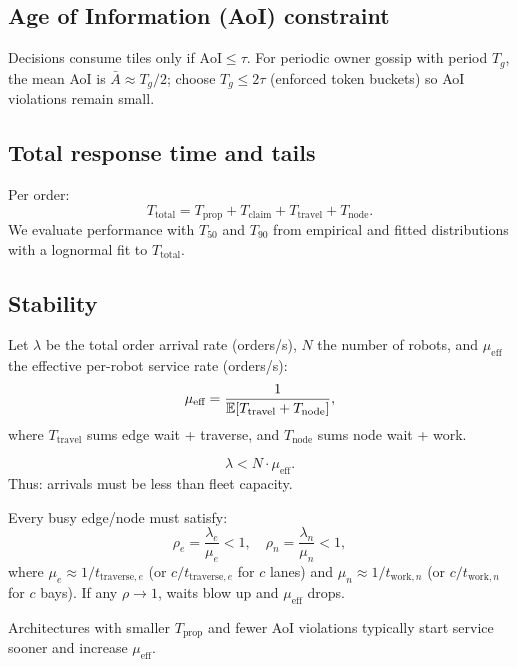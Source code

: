 \subsection*{Age of Information (AoI) constraint}
Decisions consume tiles only if $\text{AoI}\le \tau$.
For periodic owner gossip with period $T_g$, the mean AoI is $\bar{A}\!\approx\!T_g/2$; choose $T_g\!\le\!2\tau$ (enforced token buckets) so AoI violations remain small.

\subsection*{Total response time and tails}
Per order:
\begin{equation}
  T_{\text{total}} = T_{\text{prop}} + T_{\text{claim}} + T_{\text{travel}} + T_{\text{node}}.
\end{equation}
We evaluate performance with $T_{50}$ and $T_{90}$ from empirical and fitted distributions with a lognormal fit to $T_{\text{total}}$.

\subsection*{Stability}

Let $\lambda$ be the total order arrival rate (orders/s), $N$ the number of robots, and $\mu_{\text{eff}}$ the effective per-robot service rate (orders/s):
\begin{equation}
  \mu_{\text{eff}} = \frac{1}{\mathbb{E}[T_{\text{travel}} + T_{\text{node}}]},
\end{equation}
where $T_{\text{travel}}$ sums edge wait + traverse, and $T_{\text{node}}$ sums node wait + work.

\begin{equation}
  \lambda < N \cdot \mu_{\text{eff}}.
\end{equation}
Thus: arrivals must be less than fleet capacity.

Every busy edge/node must satisfy:
\begin{equation}
  \rho_e = \frac{\lambda_e}{\mu_e} < 1, \quad \rho_n = \frac{\lambda_n}{\mu_n} < 1,
\end{equation}
where $\mu_e \approx 1/t_{\text{traverse},e}$ (or $c/t_{\text{traverse},e}$ for $c$ lanes) and $\mu_n \approx 1/t_{\text{work},n}$ (or $c/t_{\text{work},n}$ for $c$ bays). If any $\rho \to 1$, waits blow up and $\mu_{\text{eff}}$ drops.

Architectures with smaller $T_{\text{prop}}$ and fewer AoI violations typically start service sooner and increase $\mu_{\text{eff}}$.

